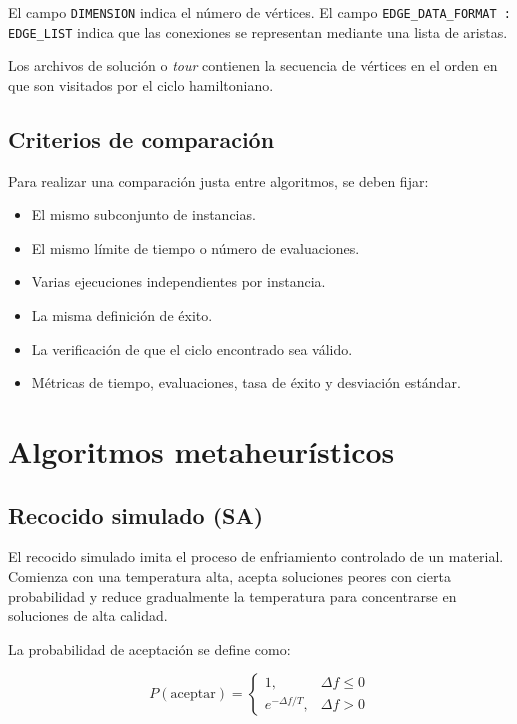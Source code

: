 \documentclass[12pt]{article}
\begin{document}
El campo \texttt{DIMENSION} indica el número de vértices. El campo \texttt{EDGE\_DATA\_FORMAT : EDGE\_LIST} indica que las conexiones se representan mediante una lista de aristas. \cite{fhcpset}

Los archivos de solución o \textit{tour} contienen la secuencia de vértices en el orden en que son visitados por el ciclo hamiltoniano. \cite{fhcpset}

\subsection{Criterios de comparación}

Para realizar una comparación justa entre algoritmos, se deben fijar:

\begin{itemize}
    \item El mismo subconjunto de instancias.
    \item El mismo límite de tiempo o número de evaluaciones.
    \item Varias ejecuciones independientes por instancia.
    \item La misma definición de éxito.
    \item La verificación de que el ciclo encontrado sea válido.
    \item Métricas de tiempo, evaluaciones, tasa de éxito y desviación estándar.
\end{itemize}

\section{Algoritmos metaheurísticos}

\subsection{Recocido simulado (SA)}

El recocido simulado imita el proceso de enfriamiento controlado de un material. Comienza con una temperatura alta, acepta soluciones peores con cierta probabilidad y reduce gradualmente la temperatura para concentrarse en soluciones de alta calidad.

La probabilidad de aceptación se define como:

\[
P(\text{aceptar})=
\begin{cases}
1, & \Delta f \leq 0 \\
e^{-\Delta f/T}, & \Delta f>0
\end{cases}
\]
\end{document}

